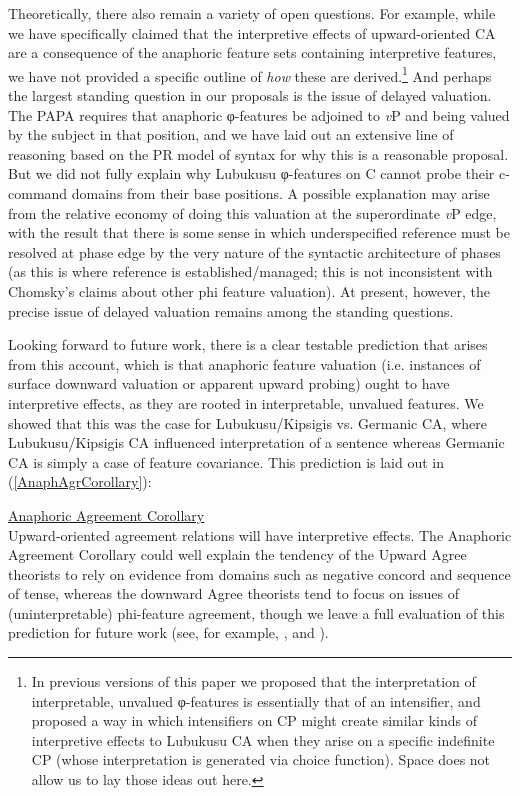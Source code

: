 \documentclass[output=paper
,modfonts
,nonflat
]{langsci/langscibook}
\begin{document}
Theoretically, there also remain a variety of open questions. For example, while we have specifically claimed that the interpretive effects of upward-oriented CA are a consequence of the anaphoric feature sets containing interpretive features, we have not provided a specific outline of \textit{how} these are derived.\footnote{In previous versions of this paper we proposed that the interpretation of interpretable, unvalued φ-features is essentially that of an intensifier, and proposed a way in which intensifiers on CP might create similar kinds of interpretive effects to Lubukusu CA when they arise on a specific indefinite CP (whose interpretation is generated via choice function). Space does not allow us to lay those ideas out here.} And perhaps the largest standing question in our proposals is the issue of delayed valuation. The PAPA requires that anaphoric φ-features be adjoined to \textit{v}P and being valued by the subject in that position, and we have laid out an extensive line of reasoning based on the PR model of syntax for why this is a reasonable proposal. But we did not fully explain why Lubukusu φ-features on C cannot probe their c-command domains from their base positions. A possible explanation may arise from the relative economy of doing this valuation at the superordinate \textit{v}P edge, with the result that there is some sense in which underspecified reference must be resolved at phase edge by the very nature of the syntactic architecture of phases (as this is where reference is established/managed; this is not inconsistent with Chomsky's \citeyear{Chomsky2008} claims about other phi feature valuation). At present, however, the precise issue of delayed valuation remains among the standing questions. 

Looking forward to future work, there is a clear testable prediction that arises from this account, which is that anaphoric feature valuation (i.e. instances of surface downward valuation or apparent upward probing) ought to have interpretive effects, as they are rooted in interpretable, unvalued features. We showed that this was the case for Lubukusu/Kipsigis vs. Germanic CA, where Lubukusu/Kipsigis CA influenced interpretation of a sentence whereas Germanic CA is simply a case of feature covariance. This prediction is laid out in (\ref{AnaphAgrCorollary}): 

\ea \label{AnaphAgrCorollary}
\underline{Anaphoric Agreement Corollary} \\
Upward-oriented agreement relations will have interpretive effects.
\z
\noindent The Anaphoric Agreement Corollary could well explain the tendency of the Upward Agree theorists to rely on evidence from domains such as negative concord and sequence of tense, whereas the downward Agree theorists tend to focus on issues of (uninterpretable) phi-feature agreement, though we leave a full evaluation of this prediction for future work (see, for example, \citealt{Bjorkman:toappearb}, and \citealt{Preminger:2013}). 
\end{document}
